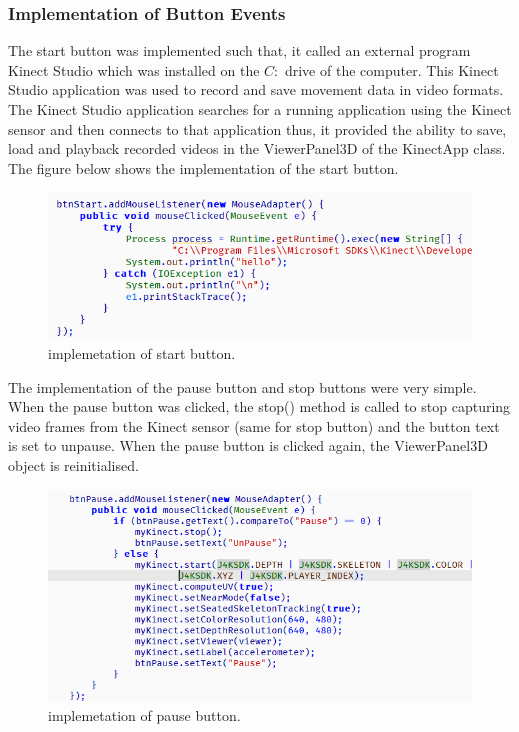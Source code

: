 \documentclass[a4paper, 12pt]{article}
\begin{document}
\subsubsection{Implementation of Button Events}

The start button was implemented such that, it called an external program Kinect Studio which was installed on the $C:$ drive of the computer. This Kinect Studio application was used to record and save movement data in video formats. The Kinect Studio application searches for a running application using the Kinect sensor and then connects to that application thus, it provided the ability to save, load and playback recorded videos in the ViewerPanel3D of the KinectApp class. The figure below shows the implementation of the start button. 

\begin{figure}[!htb]
	\begin{center}
  \includegraphics[scale=0.7]{codesnippet14.png}
  	\caption{implemetation of start button.}
  \end{center} 
  \label{fig: codesnippet13} 
\end{figure}

The implementation of the pause button and stop buttons were very simple. When the pause button was clicked, the stop() method is called to stop capturing video frames from the Kinect sensor (same for stop button) and the button text is set to unpause. When the pause button is clicked again, the ViewerPanel3D object is reinitialised. 

\begin{figure}[!htb]
	\begin{center}
  \includegraphics[scale=0.7]{codesnippet15.png}
  	\caption{implemetation of pause button.}
  \end{center} 
  \label{fig: codesnippet14} 
\end{figure}
\end{document}
